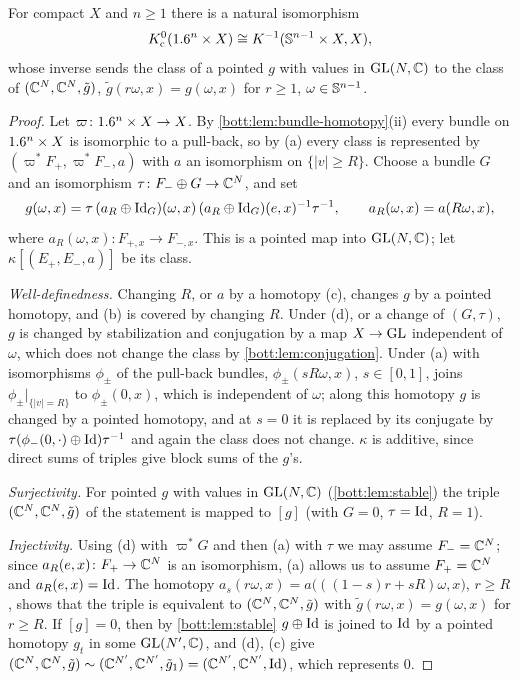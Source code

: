 \begin{lemma}[Clutching]\label{bott:lem:clutching}
  For compact $X$ and $n\ge1$ there is a natural isomorphism
  \begin{equation*}
    K_{\mathrm{c}}^0(1.6^n\times X)\cong K^{-1}(\mathbb{S}^{n-1}\times X,X),
  \end{equation*}
  whose inverse sends the class of a pointed $g$ with values in $\operatorname{GL}(N,\mathbb{C})$ to the class of
  $(\mathbb{C}^N,\mathbb{C}^N,\tilde g)$, $\tilde g(r\omega,x)=g(\omega,x)$ for $r\ge1$, $\omega\in\mathbb{S}^{n-1}$.
\end{lemma}
\begin{proof}
  Let $\varpi\colon1.6^n\times X\to X$. By \cref{bott:lem:bundle-homotopy}(ii) every bundle on
  $1.6^n\times X$ is isomorphic to a pull-back, so by (a) every class is represented by
  $(\varpi^*F_+,\varpi^*F_-,a)$ with $a$ an isomorphism on $\{|v|\ge R\}$. Choose a bundle $G$
  and an isomorphism $\tau\colon F_-\oplus G\to\mathbb{C}^N$, and set
  \begin{equation*}
    g(\omega,x)=\tau\,(a_R\oplus\operatorname{Id}_G)(\omega,x)\,(a_R\oplus\operatorname{Id}_G)(e,x)^{-1}\tau^{-1},\qquad
    a_R(\omega,x)=a(R\omega,x),
  \end{equation*}
  where $a_R(\omega,x)\colon F_{+,x}\to F_{-,x}$. This is a pointed map into $\operatorname{GL}(N,\mathbb{C})$; let
  $\kappa[(E_+,E_-,a)]$ be its class.

  \emph{Well-definedness.} Changing $R$, or $a$ by a homotopy (c), changes $g$ by a pointed
  homotopy, and (b) is covered by changing $R$. Under (d), or a change of $(G,\tau)$, $g$ is
  changed by stabilization and conjugation by a map $X\to\operatorname{GL}$ independent of $\omega$, which
  does not change the class by \cref{bott:lem:conjugation}. Under (a) with isomorphisms
  $\phi_\pm$ of the pull-back bundles, $\phi_\pm(s R\omega,x)$, $s\in[0,1]$, joins
  $\phi_\pm|_{\{|v|=R\}}$ to $\phi_\pm(0,x)$, which is independent of $\omega$; along this
  homotopy $g$ is changed by a pointed homotopy, and at $s=0$ it is replaced by its conjugate
  by $\tau(\phi_-(0,\cdot)\oplus\operatorname{Id})\tau^{-1}$ and again the class does not change. $\kappa$ is
  additive, since direct sums of triples give block sums of the $g$'s.

  \emph{Surjectivity.} For pointed $g$ with values in $\operatorname{GL}(N,\mathbb{C})$ (\cref{bott:lem:stable})
  the triple $(\mathbb{C}^N,\mathbb{C}^N,\tilde g)$ of the statement is mapped to $[g]$ (with $G=0$, $\tau=\operatorname{Id}$,
  $R=1$).

  \emph{Injectivity.} Using (d) with $\varpi^*G$ and then (a) with $\tau$ we may assume
  $F_-=\mathbb{C}^N$; since $a_R(e,x)\colon F_+\to\mathbb{C}^N$ is an isomorphism, (a) allows us to assume
  $F_+=\mathbb{C}^N$ and $a_R(e,x)=\operatorname{Id}$. The homotopy
  $a_s(r\omega,x)=a\big(((1-s)r+sR)\omega,x\big)$, $r\ge R$, shows that the triple is equivalent
  to $(\mathbb{C}^N,\mathbb{C}^N,\tilde g)$ with $\tilde g(r\omega,x)=g(\omega,x)$ for $r\ge R$. If $[g]=0$, then
  by \cref{bott:lem:stable} $g\oplus\operatorname{Id}$ is joined to $\operatorname{Id}$ by a pointed homotopy $g_t$ in some
  $\operatorname{GL}(N',\mathbb{C})$, and (d), (c) give
  $(\mathbb{C}^N,\mathbb{C}^N,\tilde g)\sim(\mathbb{C}^{N'},\mathbb{C}^{N'},\tilde g_1)=(\mathbb{C}^{N'},\mathbb{C}^{N'},\operatorname{Id})$, which represents
  $0$.
\end{proof}

